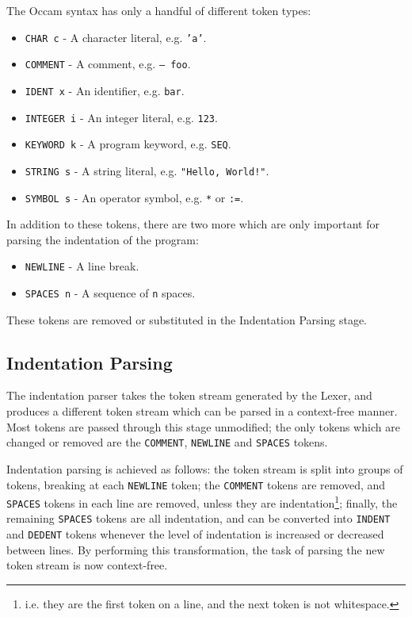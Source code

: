 The Occam syntax has only a handful of different token types:
\begin{itemize}
  \item \texttt{CHAR c} - A character literal, e.g. \texttt{'a'}.
  \item \texttt{COMMENT} - A comment, e.g. \texttt{-- foo}.
  \item \texttt{IDENT x} - An identifier, e.g. \texttt{bar}.
  \item \texttt{INTEGER i} - An integer literal, e.g. \texttt{123}.
  \item \texttt{KEYWORD k} - A program keyword, e.g. \texttt{SEQ}.
  \item \texttt{STRING s} - A string literal, e.g. \texttt{"Hello, World!"}.
  \item \texttt{SYMBOL s} - An operator symbol, e.g. \texttt{*} or \texttt{:=}.
\end{itemize}
In addition to these tokens, there are two more which are only important for
parsing the indentation of the program:
\begin{itemize}
  \item \texttt{NEWLINE} - A line break.
  \item \texttt{SPACES n} - A sequence of \texttt{n} spaces.
\end{itemize}
These tokens are removed or substituted in the Indentation Parsing stage.

\subsection{Indentation Parsing} \label{design-indent}

The indentation parser takes the token stream generated by the Lexer, and
produces a different token stream which can be parsed in a context-free manner.
Most tokens are passed through this stage unmodified; the only tokens which are
changed or removed are the \texttt{COMMENT}, \texttt{NEWLINE} and
\texttt{SPACES} tokens.

Indentation parsing is achieved as follows: the token stream is split into
groups of tokens, breaking at each \texttt{NEWLINE} token; the \texttt{COMMENT}
tokens are removed, and \texttt{SPACES} tokens in each line are removed, unless
they are indentation\footnote{i.e. they are the first token on a line, and the
next token is not whitespace.}; finally, the remaining \texttt{SPACES} tokens
are all indentation, and can be converted into \texttt{INDENT} and
\texttt{DEDENT} tokens whenever the level of indentation is increased or
decreased between lines. By performing this transformation, the task of parsing
the new token stream is now context-free.

